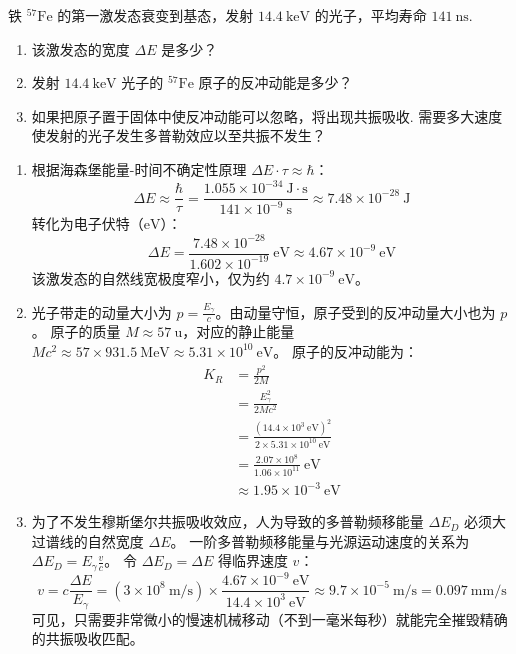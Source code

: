 \begin{exercise}\label{ex:29.28}
铁 $^{57}\mathrm{Fe}$ 的第一激发态衰变到基态，发射 $14.4 \ \mathrm{keV}$ 的光子，平均寿命 $141 \ \mathrm{ns}$. 
\begin{enumerate}
  \item[(a)] 该激发态的宽度 $\Delta E$ 是多少？
  \item[(b)] 发射 $14.4 \ \mathrm{keV}$ 光子的 $^{57}\mathrm{Fe}$ 原子的反冲动能是多少？
  \item[(c)] 如果把原子置于固体中使反冲动能可以忽略，将出现共振吸收. 需要多大速度使发射的光子发生多普勒效应以至共振不发生？
\end{enumerate}
\end{exercise}
\begin{solution}
\begin{enumerate}
    \item[(a)] 根据海森堡能量-时间不确定性原理 $\Delta E \cdot \tau \approx \hbar$：
    $$ \Delta E \approx \frac{\hbar}{\tau} = \frac{1.055 \times 10^{-34} \ \mathrm{J \cdot s}}{141 \times 10^{-9} \ \mathrm{s}} \approx 7.48 \times 10^{-28} \ \mathrm{J} $$
    转化为电子伏特（$\mathrm{eV}$）：
    $$ \Delta E = \frac{7.48 \times 10^{-28}}{1.602 \times 10^{-19}} \ \mathrm{eV} \approx 4.67 \times 10^{-9} \ \mathrm{eV} $$
    该激发态的自然线宽极度窄小，仅为约 $4.7 \times 10^{-9} \ \mathrm{eV}$。

    \item[(b)] 光子带走的动量大小为 $p = \frac{E_\gamma}{c}$。由动量守恒，原子受到的反冲动量大小也为 $p$。
    原子的质量 $M \approx 57 \ \mathrm{u}$，对应的静止能量 $Mc^2 \approx 57 \times 931.5 \ \mathrm{MeV} \approx 5.31 \times 10^{10} \ \mathrm{eV}$。
    原子的反冲动能为：
    \[
    \begin{aligned}
    K_R &= \frac{p^2}{2M}\\
      &= \frac{E_\gamma^2}{2Mc^2}\\
      &= \frac{(14.4 \times 10^3 \ \mathrm{eV})^2}{2 \times 5.31 \times 10^{10} \ \mathrm{eV}}\\
      &= \frac{2.07 \times 10^8}{1.06 \times 10^{11}} \ \mathrm{eV}\\
      &\approx 1.95 \times 10^{-3} \ \mathrm{eV}
    \end{aligned}
    \]
    
    \item[(c)] 为了不发生穆斯堡尔共振吸收效应，人为导致的多普勒频移能量 $\Delta E_D$ 必须大过谱线的自然宽度 $\Delta E$。
    一阶多普勒频移能量与光源运动速度的关系为 $\Delta E_D = E_\gamma \frac{v}{c}$。
    令 $\Delta E_D = \Delta E$ 得临界速度 $v$：
    $$ v = c \frac{\Delta E}{E_\gamma} = (3 \times 10^8 \ \mathrm{m/s}) \times \frac{4.67 \times 10^{-9} \ \mathrm{eV}}{14.4 \times 10^3 \ \mathrm{eV}} \approx 9.7 \times 10^{-5} \ \mathrm{m/s} = 0.097 \ \mathrm{mm/s} $$
    可见，只需要非常微小的慢速机械移动（不到一毫米每秒）就能完全摧毁精确的共振吸收匹配。
\end{enumerate}
\end{solution}

